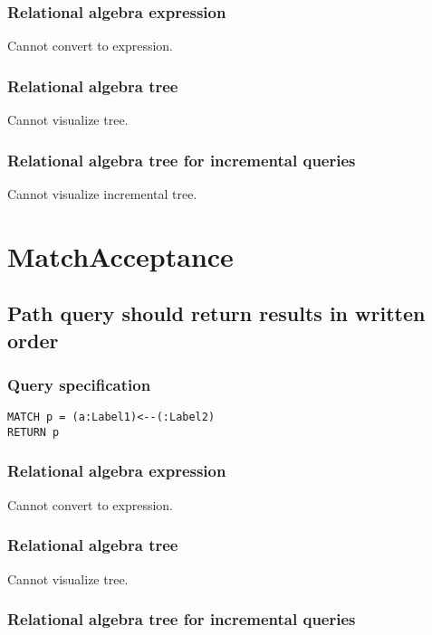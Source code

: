 \subsubsection*{Relational algebra expression}

Cannot convert to expression.

\subsubsection*{Relational algebra tree}

Cannot visualize tree.

\subsubsection*{Relational algebra tree for incremental queries}

Cannot visualize incremental tree.

\section{MatchAcceptance}

\subsection{Path query should return results in written order}

\subsubsection*{Query specification}

\begin{lstlisting}
MATCH p = (a:Label1)<--(:Label2)
RETURN p
\end{lstlisting}

\subsubsection*{Relational algebra expression}

Cannot convert to expression.

\subsubsection*{Relational algebra tree}

Cannot visualize tree.

\subsubsection*{Relational algebra tree for incremental queries}

